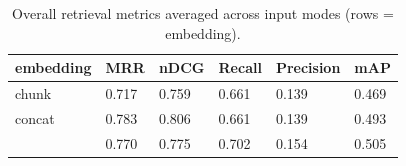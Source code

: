 \begin{table}
\caption{Overall retrieval metrics averaged across input modes (rows = embedding).}
\label{tab:overview-by-embedding}
\begin{tabular}{llllll}
\toprule
embedding & MRR & nDCG & Recall & Precision & mAP \\
\midrule
chunk & 0.717 & 0.759 & 0.661 & 0.139 & 0.469 \\
concat & 0.783 & 0.806 & 0.661 & 0.139 & 0.493 \\
 & 0.770 & 0.775 & 0.702 & 0.154 & 0.505 \\
\bottomrule
\end{tabular}
\end{table}

